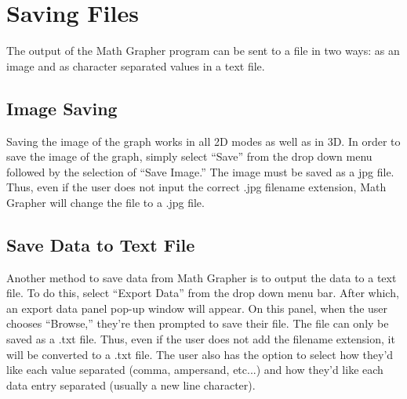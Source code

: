 \documentclass{article}[12 pt]
\begin{document}
		\pagebreak
		\section{Saving Files}
		 The output of the Math Grapher program can be sent to a file in two ways: as an image and as character separated values in a text file. 
		 \subsection{Image Saving}
		 Saving the image of the graph works in all 2D modes as well as in 3D. In order to save the image of the graph, simply select ``Save'' from the drop down menu followed by the selection of ``Save Image.'' The image must be saved as a jpg file. Thus, even if the user does not input the correct .jpg filename extension, Math Grapher will change the file to a .jpg file. 
		 \subsection{Save Data to Text File}
		 Another method to save data from Math Grapher is to output the data to a text file. To do this, select  ``Export Data'' from the drop down menu bar. After which, an export data panel pop-up window will appear. On this panel, when the user chooses ``Browse,'' they're then prompted to save their file. The file can only be saved as a .txt file. Thus, even if the user does not add the filename extension, it will be converted to a .txt file. The user also has the option to select how they'd like each value separated (comma, ampersand, etc...) and how they'd like each data entry separated (usually a new line character). 
\end{document}
